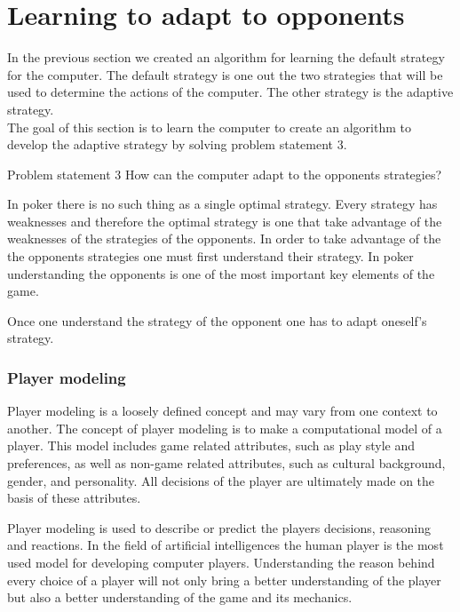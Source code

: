 \section{Learning to adapt to opponents}
\label{sec:part3}

In the previous section we created an algorithm for learning the default strategy for the computer. The default strategy is one out the two strategies that will be used to determine the actions of the computer. The other strategy is the adaptive strategy. \\

The goal of this section is to learn the computer to create an algorithm to develop the adaptive strategy by solving problem statement 3.

\vspace{4mm}
\begin{statementBox2}{Problem statement 3}
  How can the computer adapt to the opponents strategies?
\end{statementBox2}
\vspace{4mm}

In poker there is no such thing as a single optimal strategy. Every strategy has weaknesses and therefore the optimal strategy is one that take advantage of the weaknesses of the strategies of the opponents. In order to take advantage of the the opponents strategies one must first understand their strategy. In poker understanding the opponents is one of the most important key elements of the game. 

Once one understand the strategy of the opponent one has to adapt oneself's strategy.



\subsubsection{Player modeling}
Player modeling is a loosely defined concept and may vary from one context to another. The concept of player modeling is to make a computational model of a player. This model includes game related attributes, such as play style and preferences, as well as non-game related attributes, such as cultural background, gender, and personality. All decisions of the player are ultimately made on the basis of these attributes. 

Player modeling is used to describe or predict the players decisions, reasoning and reactions. In the field of artificial intelligences the human player is the most used model for developing computer players. Understanding the reason behind every choice of a player will not only bring a better understanding of the player but also a better understanding of the game and its mechanics.

